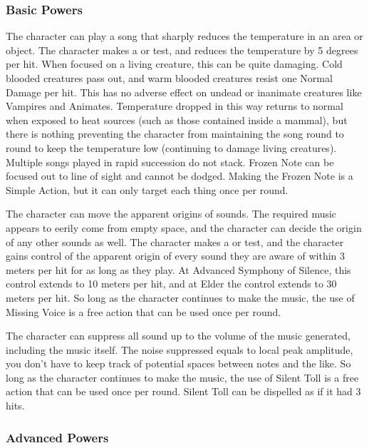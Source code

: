 \subsubsection{Basic Powers}

 The character can play a song that sharply reduces the temperature in an area or object. The character makes a  or  test, and reduces the temperature by 5 degrees per hit. When focused on a living creature, this can be quite damaging. Cold blooded creatures pass out, and warm blooded creatures resist one Normal Damage per hit. This has no adverse effect on undead or inanimate creatures like Vampires and Animates. Temperature dropped in this way returns to normal when exposed to heat sources (such as those contained inside a mammal), but there is nothing preventing the character from maintaining the song round to round to keep the temperature low (continuing to damage living creatures). Multiple songs played in rapid succession do not stack. Frozen Note can be focused out to line of sight and cannot be dodged. Making the Frozen Note is a Simple Action, but it can only target each thing once per round.

 The character can move the apparent origins of sounds. The required music appears to eerily come from empty space, and the character can decide the origin of any other sounds as well. The character makes a  or  test, and the character gains control of the apparent origin of every sound they are aware of within 3 meters per hit for as long as they play. At Advanced Symphony of Silence, this control extends to 10 meters per hit, and at Elder the control extends to 30 meters per hit. So long as the character continues to make the music, the use of Missing Voice is a free action that can be used once per round.

 The character can suppress all sound up to the volume of the music generated, including the music itself. The noise suppressed equals to local peak amplitude, you don't have to keep track of potential spaces between notes and the like. So long as the character continues to make the music, the use of Silent Toll is a free action that can be used once per round. Silent Toll can be dispelled as if it had 3 hits.

\subsubsection{Advanced Powers}

